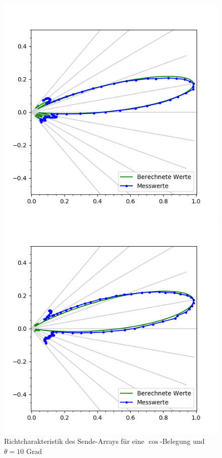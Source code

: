 \begin{figure}[htb]
\begin{minipage}{0.5\textwidth}
\includegraphics[width=\textwidth]{graphics/plot_test_characteristic_aperture_1_polar.png}
\caption{Richtcharakteristik des Sende-Arrays für eine $\cos$-Belegung und $\theta = 10$ Grad} %
\label{fig:plot_test_characteristic_aperture_1_polar}
%
\end{minipage}
\begin{minipage}{0.5\textwidth}
\includegraphics[width=\textwidth]{graphics/plot_test_characteristic_aperture_2_polar.png}

\end{minipage}
\end{figure}
